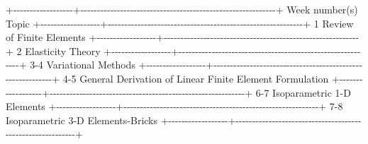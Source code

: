 +-\/-\/-\/-\/-\/-\/-\/-\/-\/-\/-\/-\/-\/-\/-\/-\/-\/-+-\/-\/-\/-\/-\/-\/-\/-\/-\/-\/-\/-\/-\/-\/-\/-\/-\/-\/-\/-\/-\/-\/-\/-\/-\/-\/-\/-\/-\/-\/-\/-\/-\/-\/-\/-\/-\/-\/-\/-\/-\/-\/-\/-\/-\/-\/-\/-\/-\/-\/-\/-\/-\/-\/-\/-\/-\/-\/-+
\textbar{} Week number(s)   \textbar{} Topic                                                     \textbar{}
+-\/-\/-\/-\/-\/-\/-\/-\/-\/-\/-\/-\/-\/-\/-\/-\/-\/-+-\/-\/-\/-\/-\/-\/-\/-\/-\/-\/-\/-\/-\/-\/-\/-\/-\/-\/-\/-\/-\/-\/-\/-\/-\/-\/-\/-\/-\/-\/-\/-\/-\/-\/-\/-\/-\/-\/-\/-\/-\/-\/-\/-\/-\/-\/-\/-\/-\/-\/-\/-\/-\/-\/-\/-\/-\/-\/-+
\textbar{} 1                \textbar{} Review of Finite Elements                                 \textbar{}
+-\/-\/-\/-\/-\/-\/-\/-\/-\/-\/-\/-\/-\/-\/-\/-\/-\/-+-\/-\/-\/-\/-\/-\/-\/-\/-\/-\/-\/-\/-\/-\/-\/-\/-\/-\/-\/-\/-\/-\/-\/-\/-\/-\/-\/-\/-\/-\/-\/-\/-\/-\/-\/-\/-\/-\/-\/-\/-\/-\/-\/-\/-\/-\/-\/-\/-\/-\/-\/-\/-\/-\/-\/-\/-\/-\/-+
\textbar{} 2                \textbar{} Elasticity Theory                                         \textbar{}
+-\/-\/-\/-\/-\/-\/-\/-\/-\/-\/-\/-\/-\/-\/-\/-\/-\/-+-\/-\/-\/-\/-\/-\/-\/-\/-\/-\/-\/-\/-\/-\/-\/-\/-\/-\/-\/-\/-\/-\/-\/-\/-\/-\/-\/-\/-\/-\/-\/-\/-\/-\/-\/-\/-\/-\/-\/-\/-\/-\/-\/-\/-\/-\/-\/-\/-\/-\/-\/-\/-\/-\/-\/-\/-\/-\/-+
\textbar{} 3-4              \textbar{} Variational Methods                                       \textbar{}
+-\/-\/-\/-\/-\/-\/-\/-\/-\/-\/-\/-\/-\/-\/-\/-\/-\/-+-\/-\/-\/-\/-\/-\/-\/-\/-\/-\/-\/-\/-\/-\/-\/-\/-\/-\/-\/-\/-\/-\/-\/-\/-\/-\/-\/-\/-\/-\/-\/-\/-\/-\/-\/-\/-\/-\/-\/-\/-\/-\/-\/-\/-\/-\/-\/-\/-\/-\/-\/-\/-\/-\/-\/-\/-\/-\/-+
\textbar{} 4-5              \textbar{} General Derivation of Linear Finite Element Formulation   \textbar{}
+-\/-\/-\/-\/-\/-\/-\/-\/-\/-\/-\/-\/-\/-\/-\/-\/-\/-+-\/-\/-\/-\/-\/-\/-\/-\/-\/-\/-\/-\/-\/-\/-\/-\/-\/-\/-\/-\/-\/-\/-\/-\/-\/-\/-\/-\/-\/-\/-\/-\/-\/-\/-\/-\/-\/-\/-\/-\/-\/-\/-\/-\/-\/-\/-\/-\/-\/-\/-\/-\/-\/-\/-\/-\/-\/-\/-+
\textbar{} 6-7              \textbar{} Isoparametric 1-D Elements                                \textbar{}
+-\/-\/-\/-\/-\/-\/-\/-\/-\/-\/-\/-\/-\/-\/-\/-\/-\/-+-\/-\/-\/-\/-\/-\/-\/-\/-\/-\/-\/-\/-\/-\/-\/-\/-\/-\/-\/-\/-\/-\/-\/-\/-\/-\/-\/-\/-\/-\/-\/-\/-\/-\/-\/-\/-\/-\/-\/-\/-\/-\/-\/-\/-\/-\/-\/-\/-\/-\/-\/-\/-\/-\/-\/-\/-\/-\/-+
\textbar{} 7-8              \textbar{} Isoparametric 3-D Elements-Bricks                         \textbar{}
+-\/-\/-\/-\/-\/-\/-\/-\/-\/-\/-\/-\/-\/-\/-\/-\/-\/-+-\/-\/-\/-\/-\/-\/-\/-\/-\/-\/-\/-\/-\/-\/-\/-\/-\/-\/-\/-\/-\/-\/-\/-\/-\/-\/-\/-\/-\/-\/-\/-\/-\/-\/-\/-\/-\/-\/-\/-\/-\/-\/-\/-\/-\/-\/-\/-\/-\/-\/-\/-\/-\/-\/-\/-\/-\/-\/-+
